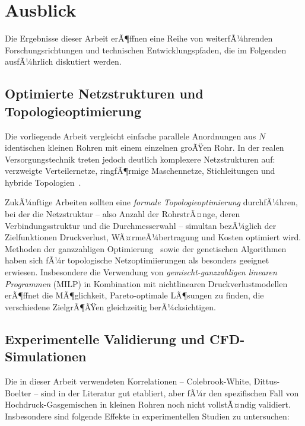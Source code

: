 ﻿\documentclass[12pt,a4paper,twoside]{article}
\theoremstyle{plain}
\theoremstyle{definition}
\theoremstyle{remark}
\begin{document}
\section{Ausblick}
\label{sec:ausblick}

Die Ergebnisse dieser Arbeit erÃ¶ffnen eine Reihe von weiterfÃ¼hrenden
Forschungsrichtungen und technischen Entwicklungspfaden, die im Folgenden
ausfÃ¼hrlich diskutiert werden.

\subsection{Optimierte Netzstrukturen und Topologieoptimierung}
\label{ssec:ausblick_topologie}

Die vorliegende Arbeit vergleicht einfache parallele Anordnungen aus $N$
identischen kleinen Rohren mit einem einzelnen groÃŸen Rohr.
In der realen Versorgungstechnik treten jedoch deutlich komplexere Netzstrukturen
auf: verzweigte Verteilernetze, ringfÃ¶rmige Maschennetze, Stichleitungen und
hybride Topologien~\cite{Helbing2015}.

ZukÃ¼nftige Arbeiten sollten eine \emph{formale Topologieoptimierung}
durchfÃ¼hren, bei der die Netzstruktur -- also Anzahl der RohrstrÃ¤nge, deren
Verbindungsstruktur und die Durchmesserwahl -- simultan bezÃ¼glich der
Zielfunktionen Druckverlust, WÃ¤rmeÃ¼bertragung und Kosten optimiert wird.
Methoden der ganzzahligen Optimierung~\cite{Floudas1995} sowie der
genetischen Algorithmen~\cite{Goldberg1989} haben sich fÃ¼r topologische
Netzoptimiierungen als besonders geeignet erwiesen.
Insbesondere die Verwendung von \emph{gemischt-ganzzahligen linearen
Programmen} (MILP) in Kombination mit nichtlinearen Druckverlustmodellen
erÃ¶ffnet die MÃ¶glichkeit, Pareto-optimale LÃ¶sungen zu finden, die
verschiedene ZielgrÃ¶ÃŸen gleichzeitig berÃ¼cksichtigen.

\subsection{Experimentelle Validierung und CFD-Simulationen}
\label{ssec:ausblick_exp}

Die in dieser Arbeit verwendeten Korrelationen -- Colebrook-White, Dittus-Boelter
-- sind in der Literatur gut etabliert, aber fÃ¼r den spezifischen Fall von
Hochdruck-Gasgemischen in kleinen Rohren noch nicht vollstÃ¤ndig validiert.
Insbesondere sind folgende Effekte in experimentellen Studien zu untersuchen:
\end{document}
